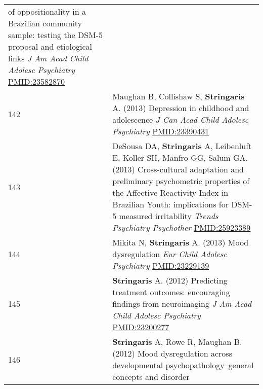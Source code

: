 \documentclass[
]{article}
\begin{document}
\begin{longtable}[]{@{}ll@{}}
\begin{minipage}[t]{0.94\columnwidth}
of oppositionality in a Brazilian community sample: testing the DSM-5
proposal and etiological links \emph{J Am Acad Child Adolesc Psychiatry}
\url{PMID:23582870}\strut
\end{minipage}\tabularnewline
\begin{minipage}[t]{0.01\columnwidth}\raggedright
142\strut
\end{minipage} & \begin{minipage}[t]{0.94\columnwidth}\raggedright
Maughan B, Collishaw S, \textbf{Stringaris} A. (2013) Depression in
childhood and adolescence \emph{J Can Acad Child Adolesc Psychiatry}
\url{PMID:23390431}\strut
\end{minipage}\tabularnewline
\begin{minipage}[t]{0.01\columnwidth}\raggedright
143\strut
\end{minipage} & \begin{minipage}[t]{0.94\columnwidth}\raggedright
DeSousa DA, \textbf{Stringaris} A, Leibenluft E, Koller SH, Manfro GG,
Salum GA. (2013) Cross-cultural adaptation and preliminary psychometric
properties of the Affective Reactivity Index in Brazilian Youth:
implications for DSM-5 measured irritability \emph{Trends Psychiatry
Psychother} \url{PMID:25923389}\strut
\end{minipage}\tabularnewline
\begin{minipage}[t]{0.01\columnwidth}\raggedright
144\strut
\end{minipage} & \begin{minipage}[t]{0.94\columnwidth}\raggedright
Mikita N, \textbf{Stringaris} A. (2013) Mood dysregulation \emph{Eur
Child Adolesc Psychiatry} \url{PMID:23229139}\strut
\end{minipage}\tabularnewline
\begin{minipage}[t]{0.01\columnwidth}\raggedright
145\strut
\end{minipage} & \begin{minipage}[t]{0.94\columnwidth}\raggedright
\textbf{Stringaris} A. (2012) Predicting treatment outcomes: encouraging
findings from neuroimaging \emph{J Am Acad Child Adolesc Psychiatry}
\url{PMID:23200277}\strut
\end{minipage}\tabularnewline
\begin{minipage}[t]{0.01\columnwidth}\raggedright
146\strut
\end{minipage} & \begin{minipage}[t]{0.94\columnwidth}\raggedright
\textbf{Stringaris} A, Rowe R, Maughan B. (2012) Mood dysregulation
across developmental psychopathology--general concepts and disorder

\end{minipage}
\end{longtable}
\end{document}
